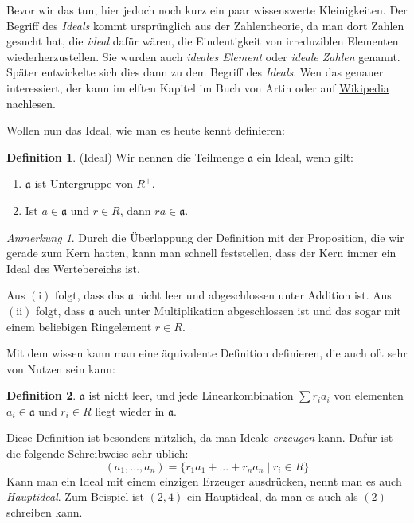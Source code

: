 \documentclass{article}
\theoremstyle{definition}
\newtheorem*{definition}{Definition}
\theoremstyle{remark}
\newtheorem*{anm}{Anmerkung}
\begin{document}
\vspace{0.7em}
Bevor wir das tun, hier jedoch noch kurz ein paar wissenswerte Kleinigkeiten. Der Begriff des \emph{Ideals}
kommt ursprünglich aus der Zahlentheorie, da man dort Zahlen gesucht hat, die \emph{ideal} dafür wären, die
Eindeutigkeit von irreduziblen Elementen wiederherzustellen. Sie wurden auch \emph{ideales Element} oder
\emph{ideale Zahlen} genannt. Später entwickelte sich dies dann zu dem Begriff des \emph{Ideals}. Wen das
genauer interessiert, der kann im elften Kapitel im Buch von Artin oder auf
\href{https://de.wikipedia.org/wiki/Ideal_(Ringtheorie)#%E2%80%9EIdeale_Zahlen%E2%80%9C}{Wikipedia} nachlesen.

\vspace{0.7em}
Wollen nun das Ideal, wie man es heute kennt definieren:

\begin{definition}(Ideal) Wir nennen die Teilmenge $\mathfrak a$ ein Ideal, wenn gilt:
\begin{enumerate}[label=(\roman*)]
    \item $\mathfrak a$ ist Untergruppe von $R^+$.
    \item Ist $a \in \mathfrak a$ und $r\in R$, dann $ra \in \mathfrak a$.
\end{enumerate}
\end{definition}

\begin{anm}
Durch die Überlappung der Definition mit der Proposition, die wir gerade zum Kern hatten, kann man schnell
feststellen, dass der Kern immer ein Ideal des Wertebereichs ist.
\end{anm}

Aus $(\mathrm i)$ folgt, dass das $\mathfrak a$ nicht leer und abgeschlossen unter Addition ist. Aus
$(\mathrm{ii})$ folgt, dass $\mathfrak a$ auch unter Multiplikation abgeschlossen ist und das sogar mit einem
beliebigen Ringelement $r\in R$.

\vspace{0.7em}
Mit dem wissen kann man eine äquivalente Definition definieren, die auch oft sehr von Nutzen sein kann:

\begin{definition}
$\mathfrak a$ ist nicht leer, und jede Linearkombination $\sum r_i a_i$ von elementen $a_i\in \mathfrak a$ und
    $r_i\in R$ liegt wieder in $\mathfrak a$.
\end{definition}

Diese Definition ist besonders nützlich, da man Ideale \emph{erzeugen} kann. Dafür ist die folgende
Schreibweise sehr üblich:
\[(a_1,...,a_n)=\{r_1 a_1 + ... + r_n a_n \mid r_i\in R\}\]
Kann man ein Ideal mit einem einzigen Erzeuger ausdrücken, nennt man es auch \emph{Hauptideal}. Zum Beispiel
ist $(2,4)$ ein Hauptideal, da man es auch als $(2)$ schreiben kann.
\end{document}
